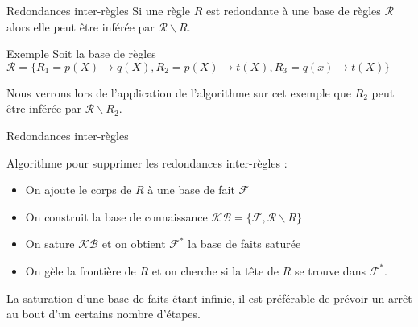 \begin{frame}{Redondances inter-règles}
    Si une règle $R$ est redondante à une base de règles $\mathcal{R}$ alors elle peut être inférée par $\mathcal{R} \backslash R$.
    
    \begin{block}{Exemple}
        Soit la base de règles $\mathcal{R} = \{ R_1 = p(X) \xrightarrow{} q(X), R_2 = p(X) \xrightarrow{} t(X), R_3 = q(x) \xrightarrow{} t(X)\}$
    \end{block}
    
    Nous verrons lors de l'application de l'algorithme sur cet exemple que $R_2$ peut être inférée par $\mathcal{R} \backslash R_2$.
    
\end{frame}

\begin{frame}{Redondances inter-règles}
   
   Algorithme pour supprimer les redondances inter-règles :
    
    \begin{itemize}
        \item On ajoute le corps de $R$ à une base de fait $\mathcal{F}$
        \item On construit la base de connaissance $\mathcal{KB} = \{\mathcal{F}, \mathcal{R} \backslash R \}$
        \item On sature $\mathcal{KB}$ et on obtient $\mathcal{F}^*$ la base de faits saturée
        \item On gèle la frontière de $R$ et on cherche si la tête de $R$ se trouve dans $\mathcal{F}^*$.
    \end{itemize}
    
    La saturation d'une base de faits étant infinie, il est préférable de prévoir un arrêt au bout d'un certains nombre d'étapes.
    
\end{frame}

